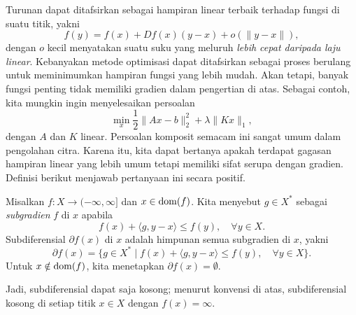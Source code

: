 Turunan dapat ditafsirkan sebagai hampiran linear terbaik terhadap fungsi di suatu titik, yakni
\begin{equation}
    f(y) = f(x) + Df(x)(y-x) + o(\|y-x\|),
\end{equation}
dengan $o$ kecil menyatakan suatu suku yang meluruh \emph{lebih cepat daripada laju linear}. Kebanyakan metode optimisasi dapat ditafsirkan sebagai proses berulang untuk meminimumkan hampiran fungsi yang lebih mudah. Akan tetapi, banyak fungsi penting tidak memiliki gradien dalam pengertian di atas. Sebagai contoh, kita mungkin ingin menyelesaikan persoalan
\begin{equation}
    \min\limits_x \frac{1}{2}\|Ax-b\|^2_2 + \lambda\|K x\|_1,
\end{equation}
dengan $A$ dan $K$ linear. Persoalan komposit semacam ini sangat umum dalam pengolahan citra.
Karena itu, kita dapat bertanya apakah terdapat gagasan hampiran linear yang lebih umum tetapi memiliki sifat serupa dengan gradien. Definisi berikut menjawab pertanyaan ini secara positif.

\begin{defn}[Subdiferensial]
    Misalkan $f:X\rightarrow(-\infty,\infty]$ dan $x\in\operatorname{\mathrm{dom}}(f)$. Kita menyebut $g\in X^*$ sebagai \emph{subgradien} $f$ di $x$ apabila
    \begin{equation}
        f(x) + \langle g, y-x\rangle\leq f(y), \quad \forall y\in X.
    \end{equation}
    Subdiferensial $\partial f(x)$ di $x$ adalah himpunan semua subgradien di $x$, yakni
    \begin{equation}
        \partial f(x) =\{ g\in X^*\;|\; f(x) + \langle g, y-x\rangle\leq f(y), \quad \forall y\in X \}.
    \end{equation}
    Untuk $x\notin\operatorname{\mathrm{dom}}(f)$, kita menetapkan $\partial f(x)=\emptyset$.
\end{defn}

Jadi, subdiferensial dapat saja kosong; menurut konvensi di atas, subdiferensial kosong di setiap titik $x\in X$ dengan $f(x)=\infty$.

